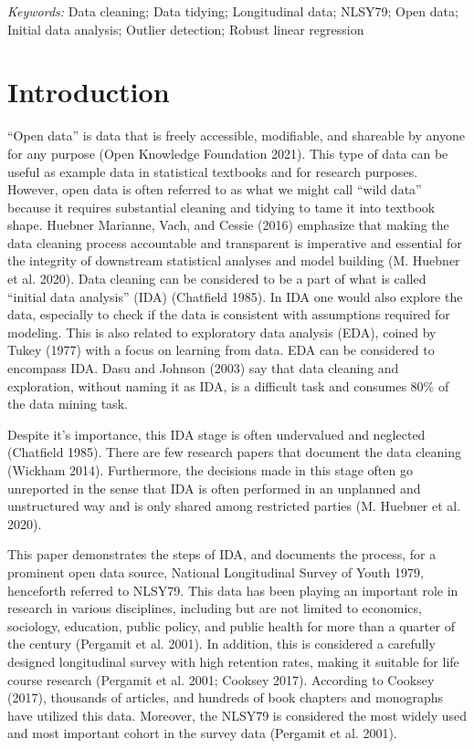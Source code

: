 \documentclass[12pt]{article}
\def\spacingset#1{\renewcommand{\baselinestretch}%
{#1}\small\normalsize} \spacingset{1}
\begin{document}
\noindent%
{\it Keywords:}  Data cleaning; Data tidying; Longitudinal data; NLSY79; Open data; Initial data analysis; Outlier detection; Robust linear regression
\vfill

\newpage
\spacingset{1.45} %

\hypertarget{intro}{%
\section{Introduction}\label{intro}}

``Open data'' is data that is freely accessible, modifiable, and shareable by anyone for any purpose (Open Knowledge Foundation 2021). This type of data can be useful as example data in statistical textbooks and for research purposes. However, open data is often referred to as what we might call ``wild data'' because it requires substantial cleaning and tidying to tame it into textbook shape. Huebner Marianne, Vach, and Cessie (2016) emphasize that making the data cleaning process accountable and transparent is imperative and essential for the integrity of downstream statistical analyses and model building (M. Huebner et al. 2020).
Data cleaning can be considered to be a part of what is called ``initial data analysis'' (IDA) (Chatfield 1985). In IDA one would also explore the data, especially to check if the data is consistent with assumptions required for modeling. This is also related to exploratory data analysis (EDA), coined by Tukey (1977) with a focus on learning from data. EDA can be considered to encompass IDA. Dasu and Johnson (2003) say that data cleaning and exploration, without naming it as IDA, is a difficult task and consumes 80\% of the data mining task.

Despite it's importance, this IDA stage is often undervalued and neglected (Chatfield 1985). There are few research papers that document the data cleaning (Wickham 2014). Furthermore, the decisions made in this stage often go unreported in the sense that IDA is often performed in an unplanned and unstructured way and is only shared among restricted parties (M. Huebner et al. 2020).

This paper demonstrates the steps of IDA, and documents the process, for a prominent open data source, National Longitudinal Survey of Youth 1979, henceforth referred to NLSY79. This data has been playing an important role in research in various disciplines, including but are not limited to economics, sociology, education, public policy, and public health for more than a quarter of the century (Pergamit et al. 2001). In addition, this is considered a carefully designed longitudinal survey with high retention rates, making it suitable for life course research (Pergamit et al. 2001; Cooksey 2017). According to Cooksey (2017), thousands of articles, and hundreds of book chapters and monographs have utilized this data. Moreover, the NLSY79 is considered the most widely used and most important cohort in the survey data (Pergamit et al. 2001).
\end{document}
